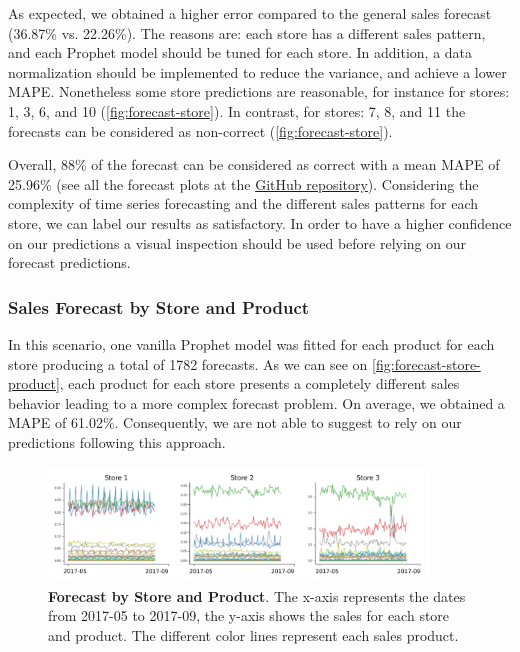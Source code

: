 As expected, we obtained a higher error compared to the general sales forecast (36.87\% vs. 22.26\%). The reasons are: each store has a different sales pattern, and each Prophet model should be tuned for each store. In addition, a data normalization should be implemented to reduce the variance, and achieve a lower MAPE. Nonetheless some store predictions are reasonable, for instance for stores: 1, 3, 6, and 10 (\autoref{fig:forecast-store}). In contrast, for stores: 7, 8, and 11 the forecasts can be considered as non-correct (\autoref{fig:forecast-store}).

Overall, 88\% of the forecast can be considered as correct with a mean MAPE of 25.96\% (see all the forecast plots at the \href{https://github.com/razielar/forecasting_retail-store}{GitHub repository}). Considering the complexity of time series forecasting and the different sales patterns for each store, we can label our results as satisfactory. In order to have a higher confidence on our predictions a visual inspection should be used before relying on our forecast predictions.

\subsubsection[Sales Forecast by Store and Product]{Sales Forecast by Store and Product}
\label{sec:forecast-product}

In this scenario, one vanilla Prophet model was fitted for each product for each store producing a total of 1782 forecasts. As we can see on \autoref{fig:forecast-store-product}, each product for each store presents a completely different sales behavior leading to a more complex forecast problem. On average, we obtained a MAPE of 61.02\%. Consequently, we are not able to suggest to rely on our predictions following this approach. 

\begin{figure}[!htb]
  \centering
  \includegraphics[width=0.9\textwidth]{plots/forecast/forecast_bystore_product.png}
  \caption[Forecast by Store and Product]{\textbf{Forecast by Store and Product}. The x-axis represents the dates from 2017-05 to 2017-09, the y-axis shows the sales for each store and product. The different color lines represent each sales product.}
  \label{fig:forecast-store-product}
\end{figure}

